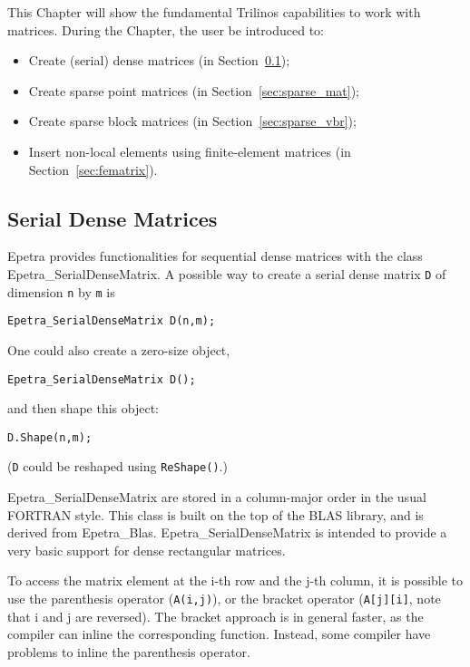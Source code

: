 This Chapter will show the fundamental Trilinos capabilities to work
with matrices. During the Chapter, the user be introduced to:
\begin{itemize}
\item Create (serial) dense matrices (in Section~\ref{sec:dense_mat});
\item Create sparse point matrices (in Section~\ref{sec:sparse_mat});
\item Create sparse block matrices (in Section~\ref{sec:sparse_vbr});
\item Insert non-local elements using finite-element matrices (in
  Section~\ref{sec:fematrix}).
\end{itemize}


\subsection{Serial Dense Matrices}
\label{sec:dense_mat}

Epetra provides functionalities for sequential dense matrices with the
class Epetra\_SerialDenseMatrix.  A possible way to create a serial
dense matrix \verb!D! of dimension \verb!n!  by \verb!m! is
\begin{verbatim}
Epetra_SerialDenseMatrix D(n,m);
\end{verbatim}
One could also create a zero-size object, 
\begin{verbatim}
Epetra_SerialDenseMatrix D();
\end{verbatim}
and then shape this object:
\begin{verbatim}
D.Shape(n,m);
\end{verbatim}
({\tt D} could be reshaped using \verb!ReShape()!.)

Epetra\_SerialDenseMatrix are stored in a column-major order in the
usual FORTRAN style. This class is built on the top of the BLAS
library, and is derived from Epetra\_Blas. Epetra\_SerialDenseMatrix is
intended to provide a very basic support for dense rectangular matrices.

\smallskip

To access the matrix element at the i-th row and the j-th column, it is
possible to use the parenthesis operator (\verb!A(i,j)!), or the bracket
operator (\verb!A[j][i]!, note that i and j are reversed). The bracket
approach is in general faster, as the compiler can inline the
corresponding function. Instead, some compiler have problems to inline
the parenthesis operator.

